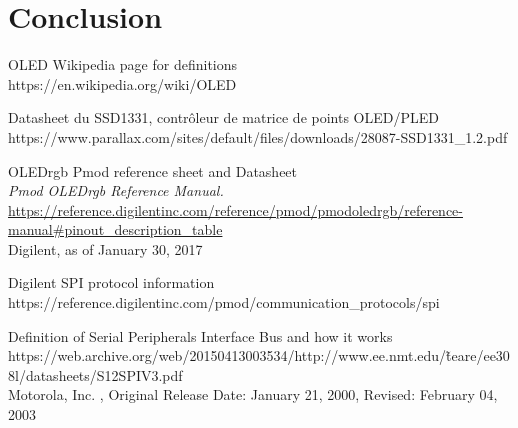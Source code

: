\documentclass[11pt]{article}
\begin{document}
\newpage

\section{Conclusion}

\clearpage
\begin{thebibliography}{9}
OLED Wikipedia page for definitions\\
https://en.wikipedia.org/wiki/OLED

Datasheet du SSD1331, contrôleur de matrice de points OLED/PLED\\
https://www.parallax.com/sites/default/files/downloads/28087-SSD1331\_1.2.pdf

OLEDrgb Pmod reference sheet and Datasheet\\
\textit{Pmod OLEDrgb Reference Manual.} \\
\href{https://reference.digilentinc.com/reference/pmod/pmodoledrgb/reference-manual#pinout_description_table}{https://reference.digilentinc.com/reference/pmod/pmodoledrgb/reference-manual\#pinout\_description\_table}\\
Digilent, as of January 30, 2017

Digilent SPI protocol information\\
https://reference.digilentinc.com/pmod/communication\_protocols/spi

Definition of Serial Peripherals Interface Bus and how it works\\
https://web.archive.org/web/20150413003534/http://www.ee.nmt.edu/\~teare/ee308l/datasheets/S12SPIV3.pdf\\
Motorola, Inc. , Original Release Date: January 21, 2000, Revised: February 04, 2003

\end{thebibliography}
\end{document}
